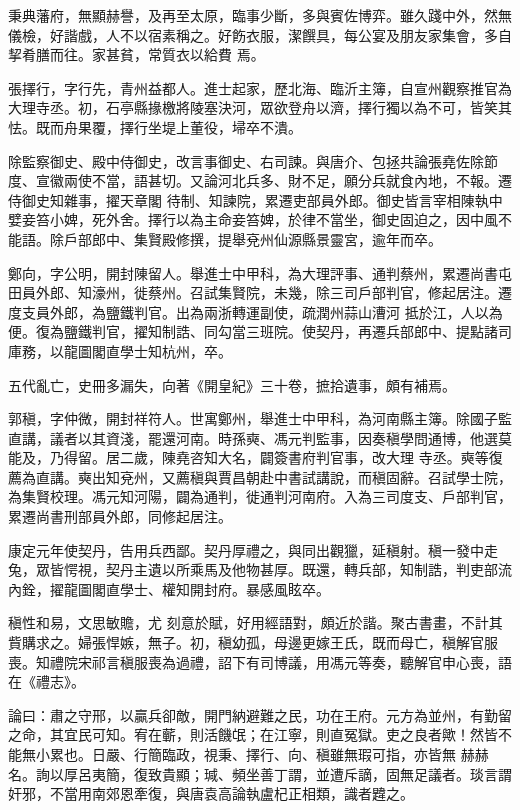\begin{pinyinscope}
 秉典藩府，無顯赫譽，及再至太原，臨事少斷，多與賓佐博弈。雖久踐中外，然無儀檢，好諧戲，人不以宿素稱之。好飭衣服，潔饌具，每公宴及朋友家集會，多自挈肴膳而往。家甚貧，常質衣以給費
 焉。



 張擇行，字行先，青州益都人。進士起家，歷北海、臨沂主簿，自宣州觀察推官為大理寺丞。初，石亭縣掾檄將陵塞決河，眾欲登舟以濟，擇行獨以為不可，皆笑其怯。既而舟果覆，擇行坐堤上董役，埽卒不潰。



 除監察御史、殿中侍御史，改言事御史、右司諫。與唐介、包拯共論張堯佐除節度、宣徽兩使不當，語甚切。又論河北兵多、財不足，願分兵就食內地，不報。遷侍御史知雜事，擢天章閣
 待制、知諫院，累遷吏部員外郎。御史皆言宰相陳執中嬖妾笞小婢，死外舍。擇行以為主命妾笞婢，於律不當坐，御史固迫之，因中風不能語。除戶部郎中、集賢殿修撰，提舉兗州仙源縣景靈宮，逾年而卒。



 鄭向，字公明，開封陳留人。舉進士中甲科，為大理評事、通判蔡州，累遷尚書屯田員外郎、知濠州，徙蔡州。召試集賢院，未幾，除三司戶部判官，修起居注。遷度支員外郎，為鹽鐵判官。出為兩浙轉運副使，疏潤州蒜山漕河
 抵於江，人以為便。復為鹽鐵判官，擢知制誥、同勾當三班院。使契丹，再遷兵部郎中、提點諸司庫務，以龍圖閣直學士知杭州，卒。



 五代亂亡，史冊多漏失，向著《開皇紀》三十卷，摭拾遺事，頗有補焉。



 郭稹，字仲微，開封祥符人。世寓鄭州，舉進士中甲科，為河南縣主簿。除國子監直講，議者以其資淺，罷還河南。時孫奭、馮元判監事，因奏稹學問通博，他選莫能及，乃得留。居二歲，陳堯咨知大名，闢簽書府判官事，改大理
 寺丞。奭等復薦為直講。奭出知兗州，又薦稹與賈昌朝赴中書試講說，而稹固辭。召試學士院，為集賢校理。馮元知河陽，闢為通判，徙通判河南府。入為三司度支、戶部判官，累遷尚書刑部員外郎，同修起居注。



 康定元年使契丹，告用兵西鄙。契丹厚禮之，與同出觀獵，延稹射。稹一發中走兔，眾皆愕視，契丹主遺以所乘馬及他物甚厚。既還，轉兵部，知制誥，判吏部流內銓，擢龍圖閣直學士、權知開封府。暴感風眩卒。



 稹性和易，文思敏贍，尤
 刻意於賦，好用經語對，頗近於諧。聚古書畫，不計其貲購求之。婦張悍嫉，無子。初，稹幼孤，母邊更嫁王氏，既而母亡，稹解官服喪。知禮院宋祁言稹服喪為過禮，詔下有司博議，用馮元等奏，聽解官申心喪，語在《禮志》。



 論曰：肅之守邢，以贏兵卻敵，開門納避難之民，功在王府。元方為並州，有勤留之命，其宜民可知。宥在蘄，則活饑氓；在江寧，則直冤獄。吏之良者歟！然皆不能無小累也。日嚴、行簡臨政，視秉、擇行、向、稹雖無瑕可指，亦皆無
 赫赫名。詢以厚呂夷簡，復致貴顯；瑊、頻坐善丁謂，並遭斥謫，固無足議者。琰言謂奸邪，不當用南郊恩牽復，與唐袁高論執盧杞正相類，識者韙之。




\end{pinyinscope}
